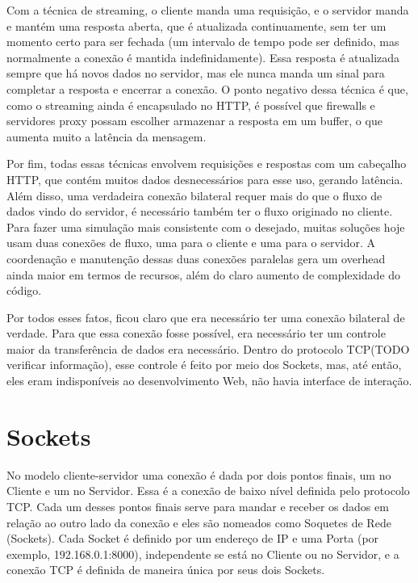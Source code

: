 \documentclass[a4paper,12pt]{article}
\begin{document}
Com a técnica de streaming, o cliente manda uma requisição, e o servidor manda e mantém uma resposta aberta, que é atualizada continuamente, sem ter um momento certo para ser fechada (um intervalo de tempo pode ser definido, mas normalmente a conexão é mantida indefinidamente). Essa resposta é atualizada sempre que há novos dados no servidor, mas ele nunca manda um sinal para completar a resposta e encerrar a conexão. O ponto negativo dessa técnica é que, como o streaming ainda é encapsulado no HTTP, é possível que firewalls e servidores proxy possam escolher armazenar a resposta em um buffer, o que aumenta muito a latência da mensagem.


Por fim, todas essas técnicas envolvem requisições e respostas com um cabeçalho HTTP, que contém muitos dados desnecessários para esse uso, gerando latência. Além disso, uma verdadeira conexão bilateral requer mais do que o fluxo de dados vindo do servidor, é necessário também ter o fluxo originado no cliente. Para fazer uma simulação mais consistente com o desejado, muitas soluções hoje usam duas conexões de fluxo, uma para o cliente e uma para o servidor. A coordenação e manutenção dessas duas conexões paralelas gera um overhead ainda maior em termos de recursos, além do claro aumento de complexidade do código.

Por todos esses fatos, ficou claro que era necessário ter uma conexão bilateral de verdade. Para que essa conexão fosse possível, era necessário ter um controle maior da transferência de dados era necessário. Dentro do protocolo TCP(TODO verificar informação), esse controle é feito por meio dos Sockets, mas, até então, eles eram indisponíveis ao desenvolvimento Web, não havia interface de interação.


\section{Sockets}

No modelo cliente-servidor uma conexão é dada por dois pontos finais, um no Cliente e um no Servidor. Essa é a conexão de baixo nível definida pelo protocolo TCP. Cada um desses pontos finais serve para mandar e receber os dados em relação ao outro lado da conexão e eles são nomeados como Soquetes de Rede (Sockets). Cada Socket é definido por um endereço de IP e uma Porta (por exemplo, 192.168.0.1:8000), independente se está no Cliente ou no Servidor, e a conexão TCP é definida de maneira única por seus dois Sockets.
\end{document}
